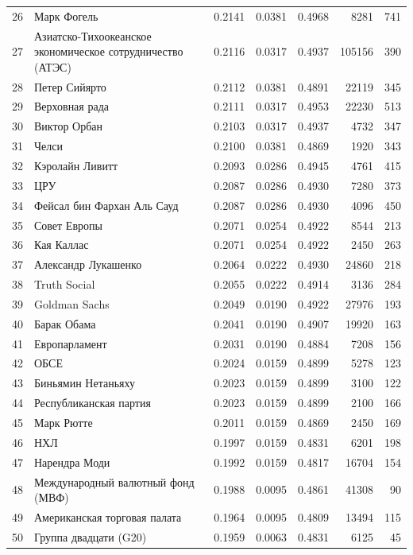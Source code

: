 {\begin{longtable}{r >{\raggedright\arraybackslash}p{4.2cm} S[table-format=1.4] S[table-format=1.4] S[table-format=1.4] r r}
26 & Марк Фогель & 0.2141 & 0.0381 & 0.4968 & 8281 & 741 \\
27 & Азиатско-Тихоокеанское экономическое сотрудничество (АТЭС) & 0.2116 & 0.0317 & 0.4937 & 105156 & 390 \\
28 & Петер Сийярто & 0.2112 & 0.0381 & 0.4891 & 22119 & 345 \\
29 & Верховная рада & 0.2111 & 0.0317 & 0.4953 & 22230 & 513 \\
30 & Виктор Орбан & 0.2103 & 0.0317 & 0.4937 & 4732 & 347 \\
31 & Челси & 0.2100 & 0.0381 & 0.4869 & 1920 & 343 \\
32 & Кэролайн Ливитт & 0.2093 & 0.0286 & 0.4945 & 4761 & 415 \\
33 & ЦРУ & 0.2087 & 0.0286 & 0.4930 & 7280 & 373 \\
34 & Фейсал бин Фархан Аль Сауд & 0.2087 & 0.0286 & 0.4930 & 4096 & 450 \\
35 & Совет Европы & 0.2071 & 0.0254 & 0.4922 & 8544 & 213 \\
36 & Кая Каллас & 0.2071 & 0.0254 & 0.4922 & 2450 & 263 \\
37 & Александр Лукашенко & 0.2064 & 0.0222 & 0.4930 & 24860 & 218 \\
38 & Truth Social & 0.2055 & 0.0222 & 0.4914 & 3136 & 284 \\
39 & Goldman Sachs & 0.2049 & 0.0190 & 0.4922 & 27976 & 193 \\
40 & Барак Обама & 0.2041 & 0.0190 & 0.4907 & 19920 & 163 \\
41 & Европарламент & 0.2031 & 0.0190 & 0.4884 & 7208 & 156 \\
42 & ОБСЕ & 0.2024 & 0.0159 & 0.4899 & 5278 & 123 \\
43 & Биньямин Нетаньяху & 0.2023 & 0.0159 & 0.4899 & 3100 & 122 \\
44 & Республиканская партия & 0.2023 & 0.0159 & 0.4899 & 2100 & 166 \\
45 & Марк Рютте & 0.2011 & 0.0159 & 0.4869 & 2450 & 169 \\
46 & НХЛ & 0.1997 & 0.0159 & 0.4831 & 6201 & 198 \\
47 & Нарендра Моди & 0.1992 & 0.0159 & 0.4817 & 16704 & 154 \\
48 & Международный валютный фонд (МВФ) & 0.1988 & 0.0095 & 0.4861 & 41308 & 90 \\
49 & Американская торговая палата & 0.1964 & 0.0095 & 0.4809 & 13494 & 115 \\
50 & Группа двадцати (G20) & 0.1959 & 0.0063 & 0.4831 & 6125 & 45 \\
\end{longtable}
}

